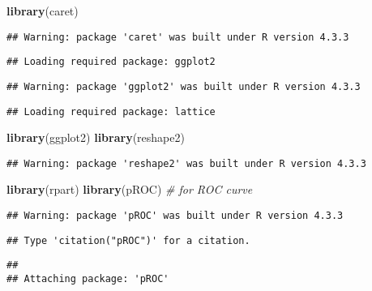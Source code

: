 \documentclass[
]{article}
\newenvironment{Shaded}{\begin{snugshade}}{\end{snugshade}}
\newcommand{\CommentTok}[1]{\textcolor[rgb]{0.56,0.35,0.01}{\textit{#1}}}
\newcommand{\FunctionTok}[1]{\textcolor[rgb]{0.13,0.29,0.53}{\textbf{#1}}}
\newcommand{\NormalTok}[1]{#1}
\begin{document}
\begin{Shaded}
\begin{Highlighting}[]
\FunctionTok{library}\NormalTok{(caret)}
\end{Highlighting}
\end{Shaded}

\begin{verbatim}
## Warning: package 'caret' was built under R version 4.3.3
\end{verbatim}

\begin{verbatim}
## Loading required package: ggplot2
\end{verbatim}

\begin{verbatim}
## Warning: package 'ggplot2' was built under R version 4.3.3
\end{verbatim}

\begin{verbatim}
## Loading required package: lattice
\end{verbatim}

\begin{Shaded}
\begin{Highlighting}[]
\FunctionTok{library}\NormalTok{(ggplot2)}
\FunctionTok{library}\NormalTok{(reshape2)}
\end{Highlighting}
\end{Shaded}

\begin{verbatim}
## Warning: package 'reshape2' was built under R version 4.3.3
\end{verbatim}

\begin{Shaded}
\begin{Highlighting}[]
\FunctionTok{library}\NormalTok{(rpart)}
\FunctionTok{library}\NormalTok{(pROC) }\CommentTok{\# for ROC curve}
\end{Highlighting}
\end{Shaded}

\begin{verbatim}
## Warning: package 'pROC' was built under R version 4.3.3
\end{verbatim}

\begin{verbatim}
## Type 'citation("pROC")' for a citation.
\end{verbatim}

\begin{verbatim}
## 
## Attaching package: 'pROC'
\end{verbatim}
\end{document}
